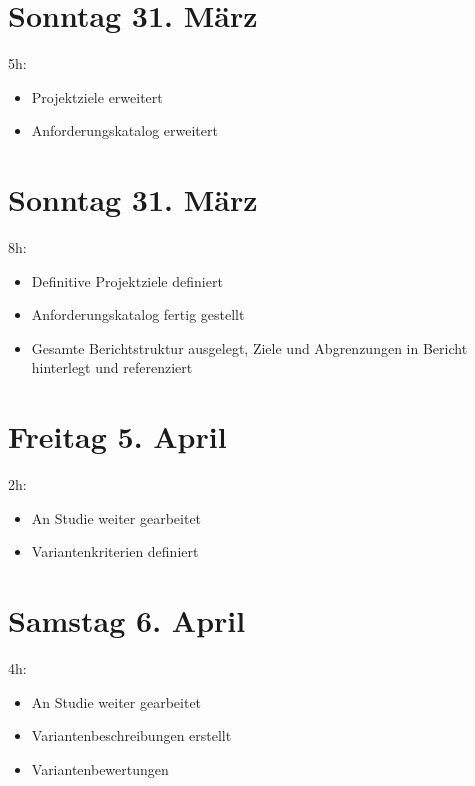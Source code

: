 \section{Sonntag 31. März}\label{sonntag-31.muxe4rz}

5h:

\begin{itemize}
  \tightlist
  \item
        Projektziele erweitert
  \item
        Anforderungskatalog erweitert
\end{itemize}

\section{Sonntag 31. März}\label{sonntag-31.muxe4rz}

8h:

\begin{itemize}
  \tightlist
  \item
        Definitive Projektziele definiert
  \item
        Anforderungskatalog fertig gestellt
  \item
        Gesamte Berichtstruktur ausgelegt, Ziele und Abgrenzungen in Bericht
        hinterlegt und referenziert
\end{itemize}

\section{Freitag 5. April}\label{freitag-5.april}

2h:

\begin{itemize}
  \tightlist
  \item
        An Studie weiter gearbeitet
  \item
        Variantenkriterien definiert
\end{itemize}

\section{Samstag 6. April}\label{samstag-6.april}

4h:

\begin{itemize}
  \tightlist
  \item
        An Studie weiter gearbeitet
  \item
        Variantenbeschreibungen erstellt
  \item
        Variantenbewertungen
\end{itemize}
